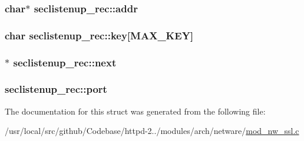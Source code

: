 \subsubsection[{\texorpdfstring{addr}{addr}}]{\setlength{\rightskip}{0pt plus 5cm}char$\ast$ seclistenup\+\_\+rec\+::addr}\hypertarget{structseclistenup__rec_a1b6ab9ef19faccecb6d4a75bc3726c18}{}\label{structseclistenup__rec_a1b6ab9ef19faccecb6d4a75bc3726c18}
\subsubsection[{\texorpdfstring{key}{key}}]{\setlength{\rightskip}{0pt plus 5cm}char seclistenup\+\_\+rec\+::key\mbox{[}{\bf M\+A\+X\+\_\+\+K\+EY}\mbox{]}}\hypertarget{structseclistenup__rec_a66259ac3184b9677cd07b8ea21c365e3}{}\label{structseclistenup__rec_a66259ac3184b9677cd07b8ea21c365e3}
\subsubsection[{\texorpdfstring{next}{next}}]{$\ast$ seclistenup\+\_\+rec\+::next}\hypertarget{structseclistenup__rec_a5a517ecc5a6836836ca202763f328477}{}\label{structseclistenup__rec_a5a517ecc5a6836836ca202763f328477}
\subsubsection[{\texorpdfstring{port}{port}}]{ seclistenup\+\_\+rec\+::port}\hypertarget{structseclistenup__rec_a6b4866bdfe4717dec5e24500ec10822c}{}\label{structseclistenup__rec_a6b4866bdfe4717dec5e24500ec10822c}


The documentation for this struct was generated from the following file\+:\begin{DoxyCompactItemize}
\item 
/usr/local/src/github/\+Codebase/httpd-\/2../modules/arch/netware/\hyperlink{mod__nw__ssl_8c}{mod\+\_\+nw\+\_\+ssl.\+c}\end{DoxyCompactItemize}
